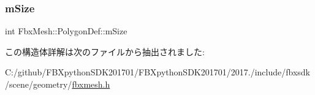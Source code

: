 \mbox{\label{struct_fbx_mesh_1_1_polygon_def_a77222b3c2e42261e765b21a871c4c066}} 
\subsubsection{\texorpdfstring{m\+Size}{mSize}}
{\footnotesize\ttfamily int Fbx\+Mesh\+::\+Polygon\+Def\+::m\+Size}



この構造体詳解は次のファイルから抽出されました\+:\begin{DoxyCompactItemize}
\item 
C\+:/github/\+F\+B\+Xpython\+S\+D\+K201701/\+F\+B\+Xpython\+S\+D\+K201701/2017./include/fbxsdk/scene/geometry/\hyperlink{fbxmesh_8h}{fbxmesh.\+h}\end{DoxyCompactItemize}
